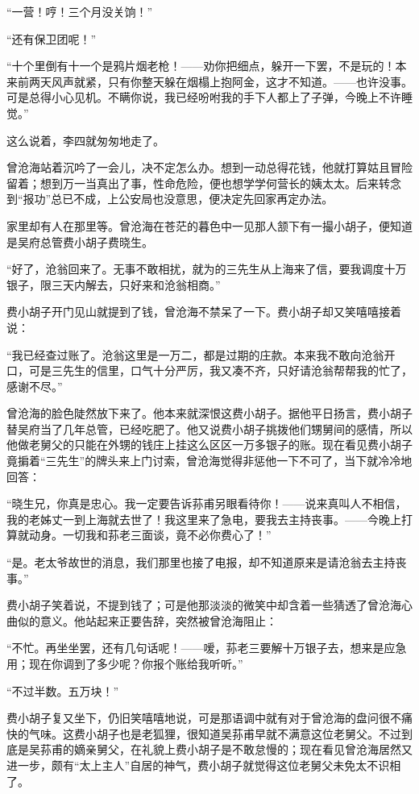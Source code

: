 \par “一营！哼！三个月没关饷！”
\par “还有保卫团呢！”
\par “十个里倒有十一个是鸦片烟老枪！——劝你把细点，躲开一下罢，不是玩的！本来前两天风声就紧，只有你整天躲在烟榻上抱阿金，这才不知道。——也许没事。可是总得小心见机。不瞒你说，我已经吩咐我的手下人都上了子弹，今晚上不许睡觉。”
\par 这么说着，李四就匆匆地走了。
\par 曾沧海站着沉吟了一会儿，决不定怎么办。想到一动总得花钱，他就打算姑且冒险留着；想到万一当真出了事，性命危险，便也想学学何营长的姨太太。后来转念到“报功”总已不成，上公安局也没意思，便决定先回家再定办法。
\par 家里却有人在那里等。曾沧海在苍茫的暮色中一见那人颔下有一撮小胡子，便知道是吴府总管费小胡子费晓生。
\par “好了，沧翁回来了。无事不敢相扰，就为的三先生从上海来了信，要我调度十万银子，限三天内解去，只好来和沧翁相商。”
\par 费小胡子开门见山就提到了钱，曾沧海不禁呆了一下。费小胡子却又笑嘻嘻接着说：
\par “我已经查过账了。沧翁这里是一万二，都是过期的庄款。本来我不敢向沧翁开口，可是三先生的信里，口气十分严厉，我又凑不齐，只好请沧翁帮帮我的忙了，感谢不尽。”
\par 曾沧海的脸色陡然放下来了。他本来就深恨这费小胡子。据他平日扬言，费小胡子替吴府当了几年总管，已经吃肥了。他又说费小胡子挑拨他们甥舅间的感情，所以他做老舅父的只能在外甥的钱庄上挂这么区区一万多银子的账。现在看见费小胡子竟掮着“三先生”的牌头来上门讨索，曾沧海觉得非惩他一下不可了，当下就冷冷地回答：
\par “晓生兄，你真是忠心。我一定要告诉荪甫另眼看待你！——说来真叫人不相信，我的老姊丈一到上海就去世了！我这里来了急电，要我去主持丧事。——今晚上打算就动身。一切我和荪老三面谈，竟不必你费心了！”
\par “是。老太爷故世的消息，我们那里也接了电报，却不知道原来是请沧翁去主持丧事。”
\par 费小胡子笑着说，不提到钱了；可是他那淡淡的微笑中却含着一些猜透了曾沧海心曲似的意义。他站起来正要告辞，突然被曾沧海阻止：
\par “不忙。再坐坐罢，还有几句话呢！——嗳，荪老三要解十万银子去，想来是应急用；现在你调到了多少呢？你报个账给我听听。”
\par “不过半数。五万块！”
\par 费小胡子复又坐下，仍旧笑嘻嘻地说，可是那语调中就有对于曾沧海的盘问很不痛快的气味。这费小胡子也是老狐狸，很知道吴荪甫早就不满意这位老舅父。不过到底是吴荪甫的嫡亲舅父，在礼貌上费小胡子是不敢怠慢的；现在看见曾沧海居然又进一步，颇有“太上主人”自居的神气，费小胡子就觉得这位老舅父未免太不识相了。
